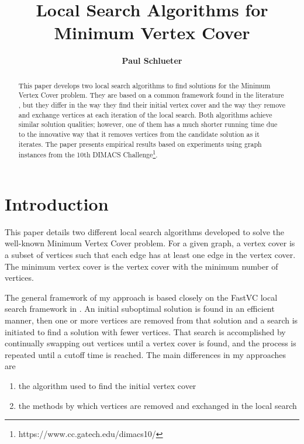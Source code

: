 \documentclass[sigconf]{acmart}
\begin{document}
\title{Local Search Algorithms for Minimum Vertex Cover}

\author{\textbf{Paul Schlueter}}

\begin{abstract}
This paper develops two local search algorithms to find solutions for the Minimum Vertex Cover problem. They are based on a common framework found in the literature \cite{cai2015fastvc}, but they differ in the way they find their initial vertex cover and the way they remove and exchange vertices at each iteration of the local search. Both algorithms achieve similar solution qualities; however, one of them has a much shorter running time due to the innovative way that it removes vertices from the candidate solution as it iterates. The paper presents empirical results based on experiments using graph instances from the 10th DIMACS Challenge\footnote{https://www.cc.gatech.edu/dimacs10/}.
\end{abstract}


\maketitle
 
\section{Introduction} \label{sec:intro}
This paper details two different local search algorithms developed to solve the well-known Minimum Vertex Cover problem. For a given graph, a vertex cover is a subset of vertices such that each edge has at least one edge in the vertex cover. The minimum vertex cover is the vertex cover with the minimum number of vertices. 

The general framework of my approach is based closely on the FastVC local search framework in \cite{cai2015fastvc}. An initial suboptimal solution is found in an efficient manner, then one or more vertices are removed from that solution and a search is initiated to find a solution with fewer vertices. That search is accomplished by continually swapping out vertices until a vertex cover is found, and the process is repeated until a cutoff time is reached. The main differences in my approaches are
\begin{enumerate}
	\item the algorithm used to find the initial vertex cover
	\item the methods by which vertices are removed and exchanged in the local search
\end{enumerate}
\end{document}

